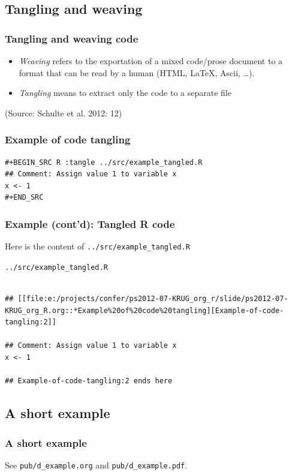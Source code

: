 \documentclass[bigger]{beamer}
\begin{document}
\subsection{Tangling and weaving}
\label{sec-3-2}
\begin{frame}
\frametitle{Tangling and weaving code}
\label{sec-3-2-1}


\begin{itemize}
\item \emph{Weaving} refers to the exportation of a mixed code/prose document to a format
  that can be read by a human (HTML, \LaTeX, Ascii, \ldots{}).
\item \emph{Tangling} means to extract only the code to a separate file
\end{itemize}

(Source: Schulte et al. 2012: 12)
\end{frame}
\begin{frame}[fragile]
\frametitle{Example of code tangling}
\label{sec-3-2-2}



\begin{verbatim}
#+BEGIN_SRC R :tangle ../src/example_tangled.R 
## Comment: Assign value 1 to variable x
x <- 1
#+END_SRC
\end{verbatim}
\end{frame}
\begin{frame}[fragile]
\frametitle{Example (cont'd): Tangled R code}
\label{sec-3-2-3}


Here is the content of \texttt{../src/example\_tangled.R}
\begin{block}{\texttt{../src/example\_tangled.R}}
\label{sec-3-2-3-1}

\begin{footnotesize}

\begin{verbatim}

## [[file:e:/projects/confer/ps2012-07-KRUG_org_r/slide/ps2012-07-KRUG_org_R.org::*Example%20of%20code%20tangling][Example-of-code-tangling:2]]

## Comment: Assign value 1 to variable x
x <- 1

## Example-of-code-tangling:2 ends here
\end{verbatim}
\end{footnotesize}
\end{block}
\end{frame}
\subsection{A short example}
\label{sec-3-3}
\begin{frame}
\frametitle{A short example}
\label{sec-3-3-1}


See \texttt{pub/d\_example.org} and \texttt{pub/d\_example.pdf}.
\end{frame}
\end{document}
